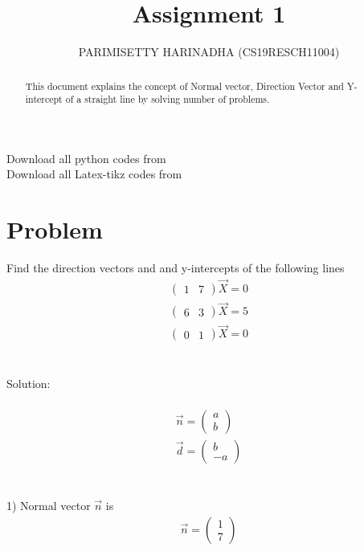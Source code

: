 \documentclass[journal,12pt,twocolumn]{IEEEtran}
\title{Assignment 1}
\author{PARIMISETTY HARINADHA (CS19RESCH11004)}
\newcommand{\myvec}[1]{\ensuremath{\begin{pmatrix}#1\end{pmatrix}}}
\begin{document}
\maketitle
\newpage
\begin{abstract}
This document explains the concept of Normal vector, Direction Vector and Y-intercept of a straight line by solving number of problems.
\end{abstract}
Download all python codes from 
 \\
\newline
Download all Latex-tikz codes from 

\section{Problem}
Find the direction vectors and and y-intercepts of the following lines \\
\begin{align} 
    		\myvec{ 1 & 7 } \vec{X} =  0
\end{align}
\begin{align} 
    		\myvec{ 6 & 3 } \vec{X} =  5
\end{align}
\begin{align} 
    		\myvec{ 0 & 1 } \vec{X} =  0
\end{align}
\\
\\
Solution:\\
\\
\begin{align}
	\vec{n} = \myvec{ a \\ b }\\
	\vec{d} = \myvec{ b \\ -a }
\end{align}
\\
\\
1) Normal vector $\vec{n}$ is   \begin{align}
	\vec{n} = \myvec{ 1 \\ 7 }
\end{align}
\\
	
\end{document}
